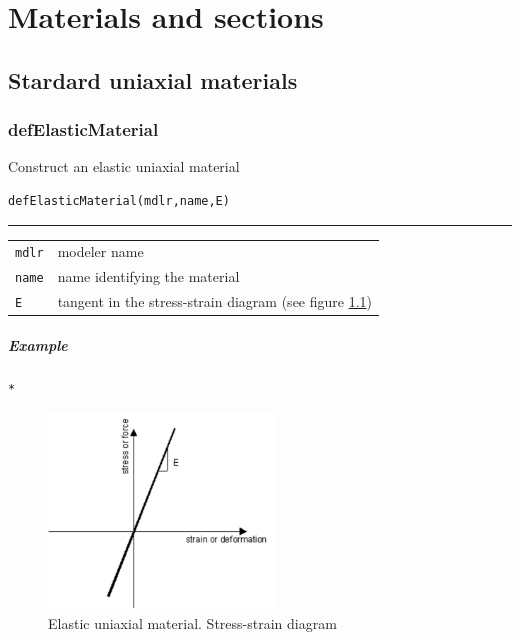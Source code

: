 \chapter{Materials and sections}
\section{Stardard uniaxial materials}
\subsection{defElasticMaterial}
\noindent Construct an elastic uniaxial material
\begin{verbatim}
defElasticMaterial(mdlr,name,E)
\end{verbatim}
\vspace{-10pt}
{\color{grayLines} \rule{\linewidth}{0.25pt}}
\begin{center}
\begin{tabular}{lp{10cm}}
{\tt mdlr} & modeler name \\
{\tt name} & name identifying the material \\
{\tt E} & tangent in the stress-strain diagram (see figure \ref{Elastic}) \\
\end{tabular}
\end{center}
\paragraph{Example}
\begin{verbatim}
*
\end{verbatim}

\begin{figure}[h]
\centering
\includegraphics[width=60mm]{materials/figures/Elastic}
\caption{Elastic uniaxial material. Stress-strain diagram}\label{Elastic}
\end{figure}

